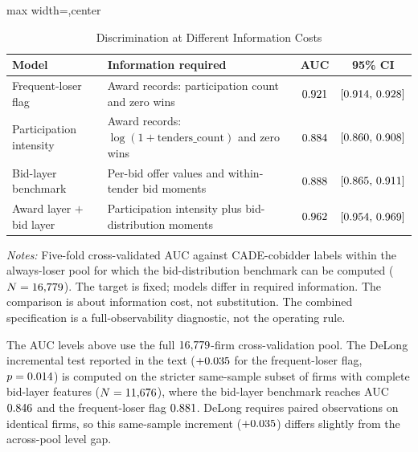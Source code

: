 \begin{table}[htbp]
\centering
\caption{Discrimination at Different Information Costs}
\label{tab:imhof_cost_submission}
\footnotesize
\begin{adjustbox}{max width=\textwidth,center}
\begin{threeparttable}
\begin{tabular}{p{4.6cm}p{5.4cm}cc}
\toprule
Model & Information required & AUC & 95\% CI \\
\midrule
Frequent-loser flag & Award records: participation count and zero wins
& $0.921$ & $[0.914,\,0.928]$ \\
Participation intensity & Award records: $\log(1+\text{tenders\_count})$ and zero wins
& $0.884$ & $[0.860,\,0.908]$ \\
Bid-layer benchmark & Per-bid offer values and within-tender bid moments
& $0.888$ & $[0.865,\,0.911]$ \\
Award layer $+$ bid layer & Participation intensity plus bid-distribution moments
& $0.962$ & $[0.954,\,0.969]$ \\
\bottomrule
\end{tabular}
\begin{tablenotes}
\footnotesize
\item \textit{Notes:} Five-fold cross-validated AUC against
CADE-cobidder labels within the always-loser pool for which the
bid-distribution benchmark can be computed
($N=16{,}779$). The target is fixed; models differ in
required information. The comparison is about information cost,
not substitution. The combined specification is a
full-observability diagnostic, not the operating rule.
\item The AUC levels above use the full $16{,}779$-firm
cross-validation pool. The DeLong incremental test reported in the
text ($+0.035$ for the frequent-loser flag, $p=0.014$)
is computed on the stricter same-sample subset of firms with
complete bid-layer features ($N=11{,}676$), where the
bid-layer benchmark reaches AUC $0.846$ and the
frequent-loser flag $0.881$. DeLong requires paired
observations on identical firms, so this same-sample increment
($+0.035$) differs slightly from the across-pool level gap.
\end{tablenotes}
\end{threeparttable}
\end{adjustbox}
\end{table}

